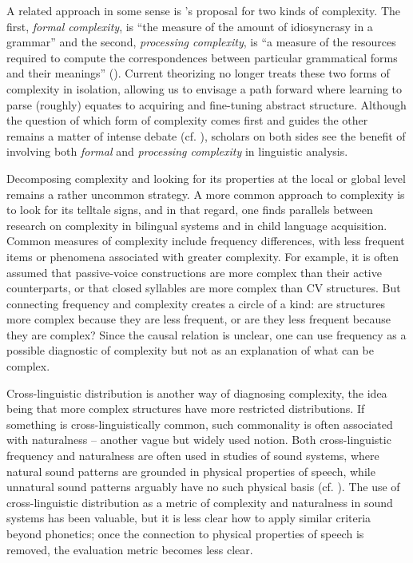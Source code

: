\documentclass[output=paper,colorlinks,citecolor=brown]{langscibook}
\begin{document}
A related approach in some sense is \citeauthor{Culicover2013}’s proposal for two kinds of complexity. The first, \textit{formal complexity}, is “the measure of the amount of idiosyncrasy in a grammar” and the second, \textit{processing complexity}, is “a measure of the resources required to compute the correspondences between particular grammatical forms and their meanings” (\citeyear[3]{Culicover2013}). Current theorizing no longer treats these two forms of complexity in isolation, allowing us to envisage a path forward where learning to parse (roughly) equates to acquiring and fine-tuning abstract structure. Although the question of which form of complexity comes first and guides the other remains a matter of intense debate (cf. \citealt{ChristiansenChater2016,Lightfoot2020}), scholars on both sides see the benefit of involving both \textit{formal} and \textit{processing complexity} in linguistic analysis.

Decomposing complexity and looking for its properties at the local or global level remains a rather uncommon strategy. A more common approach to complexity is to look for its telltale signs, and in that regard, one finds parallels between research on complexity in bilingual systems and in child language acquisition. Common measures of complexity include frequency differences, with less frequent items or phenomena associated with greater complexity. For example, it is often assumed that passive-voice constructions are more complex than their active counterparts, or that closed syllables are more complex than CV structures. But connecting frequency and complexity creates a circle of a kind: are structures more complex because they are less frequent, or are they less frequent because they are complex? Since the causal relation is unclear, one can use frequency as a possible diagnostic of complexity but not as an explanation of what can be complex. 

Cross-linguistic distribution is another way of diagnosing complexity, the idea being that more complex structures have more restricted distributions. If something is cross-linguistically common, such commonality is often associated with naturalness -- another vague but widely used notion. Both cross-linguistic frequency and naturalness are often used in studies of sound systems, where natural sound patterns are grounded in physical properties of speech, while unnatural sound patterns arguably have no such physical basis (cf. \citealt{Blevins2004,Blevins2007}). The use of cross-linguistic distribution as a metric of complexity and naturalness in sound systems has been valuable, but it is less clear how to apply similar criteria beyond phonetics; once the connection to physical properties of speech is removed, the evaluation metric becomes less clear.
\end{document}
